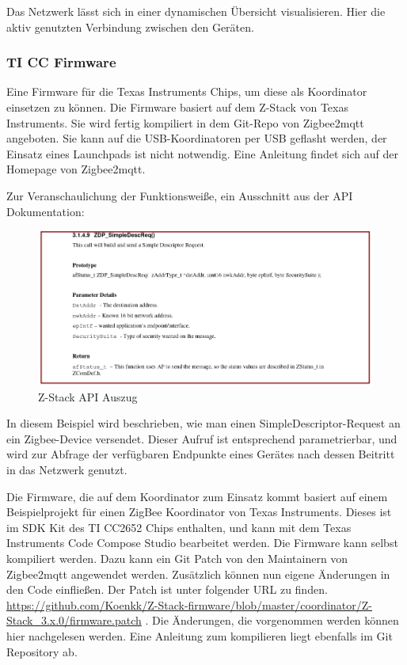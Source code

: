 Das Netzwerk lässt sich in einer dynamischen Übersicht visualisieren. Hier die aktiv genutzten Verbindung zwischen den Geräten. 


\subsubsection{TI CC Firmware}

Eine Firmware für die Texas Instruments Chips, um diese als Koordinator einsetzen zu können. Die Firmware basiert auf dem Z-Stack von Texas Instruments. Sie wird fertig kompiliert
in dem Git-Repo von Zigbee2mqtt angeboten. Sie kann auf die USB-Koordinatoren per USB geflasht werden, der Einsatz eines Launchpads ist nicht notwendig. Eine Anleitung
findet sich auf der Homepage von Zigbee2mqtt.  


Zur Veranschaulichung der Funktionsweiße, ein Ausschnitt aus der API Dokumentation:

\begin{figure}[H]
  \centering
  \includegraphics[width=1\textwidth]{media/z-stack-api-excerpt.png}
  \caption{Z-Stack API Auszug}
\end{figure}

In diesem Beispiel wird beschrieben, wie man einen SimpleDescriptor-Request an ein Zigbee-Device versendet. Dieser Aufruf ist entsprechend parametrierbar,
und wird zur Abfrage der verfügbaren Endpunkte eines Gerätes nach dessen Beitritt in das Netzwerk genutzt.

Die Firmware, die auf dem Koordinator zum Einsatz kommt basiert auf einem Beispielprojekt für einen ZigBee Koordinator von Texas Instruments. Dieses ist
im SDK Kit des TI CC2652 Chips enthalten, und kann mit dem Texas Instruments Code Compose Studio bearbeitet werden. Die Firmware kann selbst kompiliert werden.
Dazu kann ein Git Patch von den Maintainern von Zigbee2mqtt angewendet werden. Zusätzlich können nun eigene Änderungen in den Code einfließen. Der Patch ist unter
folgender URL zu finden.
\url{https://github.com/Koenkk/Z-Stack-firmware/blob/master/coordinator/Z-Stack_3.x.0/firmware.patch} .
Die Änderungen, die vorgenommen werden können hier nachgelesen werden. Eine Anleitung zum kompilieren liegt ebenfalls im Git Repository ab.

